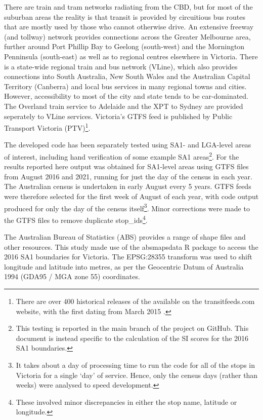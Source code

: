 \documentclass[]{tufte-book}
\begin{document}
There are train and tram networks radiating from the CBD, but for most
of the suburban areas the reality is that transit is provided by
circuitious bus routes that are mostly used by those who cannot
otherwise drive. An extensive freeway (and tollway) network provides
connections across the Greater Melbourne area, further around Port
Phillip Bay to Geelong (south-west) and the Mornington Penninsula
(south-east) as well as to regional centres elsewhere in Victoria. There
is a state-wide regional train and bus network (VLine), which also
provides connections into South Australia, New South Wales and the
Australian Capital Territory (Canberra) and local bus services in many
regional towns and cities. However, accessibility to most of the city
and state tends to be car-dominated. The Overland train service to
Adelaide and the XPT to Sydney are provided seperately to VLine
services. Victoria's GTFS feed is published by Public Transport Victoria
(PTV)\footnote{There are over 400 historical releases of the available
  on the transitfeeds.com website, with the first dating from March 2015
  \citep{transitfeeds_victoria:2023aa}.}.

The developed code has been separately tested using SA1- and LGA-level
areas of interest, including hand verification of some example SA1
areas\footnote{This testing is reported in the main branch of the
  project on GitHub. This document is instead specific to the
  calculation of the SI scores for the 2016 SA1 boundaries.}. For the
results reported here output was obtained for SA1-level areas using GTFS
files from August 2016 and 2021, running for just the day of the census
in each year. The Australian census is undertaken in early August every
5 years. GTFS feeds were therefore selected for the first week of August
of each year, with code output produced for only the day of the census
itself\footnote{It takes about a day of processing time to run the code
  for all of the stops in Victoria for a single `day' of service. Hence,
  only the census days (rather than weeks) were analysed to speed
  development.}. Minor corrections were made to the GTFS files to remove
duplicate stop\_ids\footnote{These involved minor discrepancies in
  either the stop name, latitude or longitude.}.

The Australian Bureau of Statistics (ABS) provides a range of shape
files and other resources. This study made use of the absmapsdata R
package \citep{R-absmapsdata} to access the 2016 SA1 boundaries for
Victoria. The EPSG:28355 transform \citep{EPSG_28355} was used to shift
longitude and latitude into metres, as per the Geocentric Datum of
Australia 1994 (GDA95 / MGA zone 55) coordinates.
\end{document}
